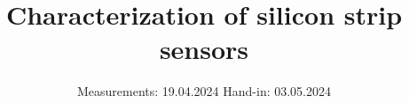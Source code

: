 

\subject{V15}
\title{Characterization of silicon strip sensors}
\date{%
  Measurements: 19.04.2024
  \hspace{3em}
  Hand-in: 03.05.2024
}



\maketitle
\thispagestyle{empty}
\tableofcontents
\newpage






\printbibliography{}


